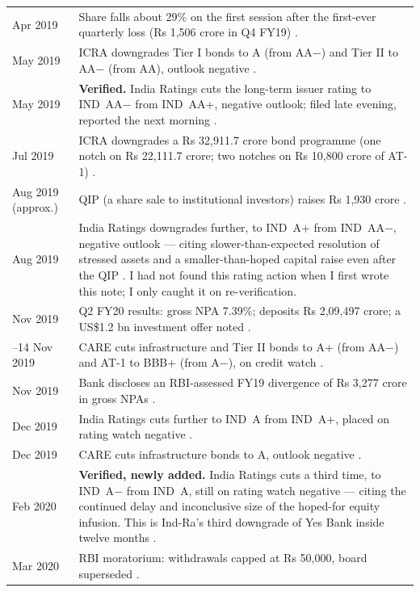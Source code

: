 \begin{longtable}{@{}>{\raggedright\arraybackslash}p{2.5cm}p{11.1cm}@{}}
30 Apr 2019 & Share falls about 29\% on the first session after the first-ever quarterly loss (Rs 1,506 crore in Q4 FY19) \cite{bsFall19}.\\
3 May 2019 & ICRA downgrades Tier I bonds to A (from AA$-$) and Tier II to AA$-$ (from AA), outlook negative \cite{bsIcraMay19,icraJul19}.\\
8 May 2019 & \textbf{Verified.} India Ratings cuts the long-term issuer rating to IND~AA$-$ from IND~AA+, negative outlook; filed late evening, reported the next morning \cite{bsIndraMay19}.\\
24 Jul 2019 & ICRA downgrades a Rs 32,911.7 crore bond programme (one notch on Rs 22,111.7 crore; two notches on Rs 10,800 crore of AT-1) \cite{icraJul19,bsIcraJul19}.\\
15 Aug 2019 (approx.) & QIP (a share sale to institutional investors) raises Rs 1,930 crore \cite{ycQ2}.\\
31 Aug 2019 & India Ratings downgrades further, to IND~A+ from IND~AA$-$, negative outlook --- citing slower-than-expected resolution of stressed assets and a smaller-than-hoped capital raise even after the QIP \cite{bsIndraAug19}. I had not found this rating action when I first wrote this note; I only caught it on re-verification.\\
1 Nov 2019 & Q2 FY20 results: gross NPA 7.39\%; deposits Rs 2,09,497 crore; a US\$1.2 bn investment offer noted \cite{ycQ2}.\\
13--14 Nov 2019 & CARE cuts infrastructure and Tier II bonds to A+ (from AA$-$) and AT-1 to BBB+ (from A$-$), on credit watch \cite{bsCareNov19}.\\
19 Nov 2019 & Bank discloses an RBI-assessed FY19 divergence of Rs 3,277 crore in gross NPAs \cite{bsDiv19}.\\
19 Dec 2019 & India Ratings cuts further to IND~A from IND~A+, placed on rating watch negative \cite{bsIndraDec19}.\\
31 Dec 2019 & CARE cuts infrastructure bonds to A, outlook negative \cite{bsCareDec19}.\\
12 Feb 2020 & \textbf{Verified, newly added.} India Ratings cuts a third time, to IND~A$-$ from IND~A, still on rating watch negative --- citing the continued delay and inconclusive size of the hoped-for equity infusion. This is Ind-Ra's third downgrade of Yes Bank inside twelve months \cite{bsIndraFeb20}.\\
5 Mar 2020 & RBI moratorium: withdrawals capped at Rs 50,000, board superseded \cite{btQ3}.\\

\end{longtable}

